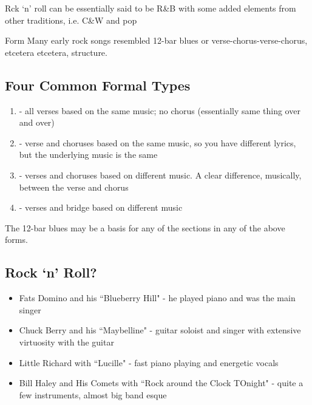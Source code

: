\documentclass[12pt, a4paper, twoside, openright, titlepage]{book}
\begin{document}
\begin{rmk}{}{}
    Rck `n' roll can be essentially said to be R\&B with some added elements from other traditions, i.e. C\&W and pop
\end{rmk}

\begin{rmk}{Form}{}{}
    Many early rock songs resembled 12-bar blues or verse-chorus-verse-chorus, etcetera etcetera, structure.
\end{rmk}

\subsection{Four Common Formal Types}

\begin{enumerate}
    \item {} - all verses based on the same music; no chorus (essentially same thing over and over)
    \item {} - verse and choruses based on the same music, so you have different lyrics, but the underlying music is the same
    \item {} - verses and choruses based on different music. A clear difference, musically, between the verse and chorus
    \item {} - verses and bridge based on different music
\end{enumerate}
\begin{note}{}{}
    The 12-bar blues may be a basis for any of the sections in any of the above forms.
\end{note}

\subsection{Rock `n' Roll?}

\begin{itemize}
    \item Fats Domino and his ``Blueberry Hill" - he played piano and was the main singer
    \item Chuck Berry and his ``Maybelline" - guitar soloist and singer with extensive virtuosity with the guitar
    \item Little Richard with ``Lucille" - fast piano playing and energetic vocals
    \item Bill Haley and His Comets with ``Rock around the Clock TOnight" - quite a few instruments, almost big band esque
\end{itemize}
\end{document}
